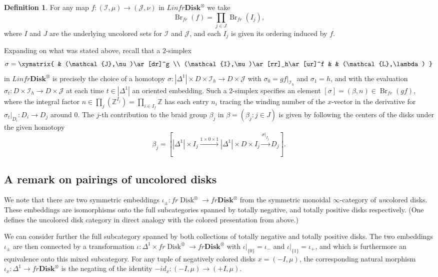 \documentclass[reqno]{amsart}
\theoremstyle{definition}
\newtheorem{definition}[lemma]{Definition}
\newcommand{\mcl}[1]{\mathcal{#1}}
\newcommand{\opn}[1]{\operatorname{#1}}
\newcommand{\ot}{\otimes}
\newcommand{\Disk}{\mathbf{Disk}}
\renewcommand{\1}{\mathbf{1}}
\begin{document}
\begin{definition}
For any map $f:(\mcl{I},\mu)\to (\mcl{J},\nu)$ in $Linfr\Disk^{\ot}$ we take
\[
\opn{Br}_{fr}(f)=\prod_{j\in J}\opn{Br}_{fr}(I_j),
\]
where $I$ and $J$ are the underlying uncolored sets for $\mcl{I}$ and $\mcl{J}$, and each $I_j$ is given its ordering induced by $f$.
\end{definition}

Expanding on what was stated above, recall that a $2$-simplex
\[
\sigma=
\xymatrix{
 & (\mcl{J},\nu)\ar[dr]^g \\
(\mcl{I},\mu)\ar[rr]_h\ar[ur]^f & & (\mcl{L},\lambda)
}
\]
in $Linfr\Disk^{\ot}$ is precisely the choice of a homotopy $\sigma:|\Delta^1|\times D\times \mcl{I}_h\to D\times \mcl{J}$ with $\sigma_0=gf|_{\mcl{I}_h}$ and $\sigma_1=h$, and with the evaluation $\sigma_t:D\times \mcl{I}_h\to D\times \mcl{J}$ at each time $t\in |\Delta^1|$ an oriented embedding.  Such a $2$-simplex specifies an element $[\sigma]=(\beta,n)\in \opn{Br}_{fr}(gf)$, where the integral factor $n\in \prod_j(\mathbb{Z}^{I_j})=\prod_{i\in I_f}\mathbb{Z}$ has each entry $n_i$ tracing the winding number of the $x$-vector in the derivative for $\sigma_t|_{D_i}:D_i\to D_j$ around $0$.  The $j$-th contribution to the braid group $\beta_j$ in $\beta=(\beta_j:j\in J)$ is given by following the centers of the disks under the given homotopy
\[
\beta_j=\left[|\Delta^1|\times I_j\overset{1\times0\times 1}\to |\Delta^1|\times D\times I_j\overset{\sigma|_{I_j}}\to D_j\right].
\]

\subsection{A remark on pairings of uncolored disks}
\label{sect:pairing}

We note that there are two symmetric embeddings $\iota_{\pm}:fr\opn{Disk}^{\ot}\to fr\Disk^{\ot}$ from the symmetric monoidal $\infty$-category of \emph{un}colored disks. These embeddings are isomorphisms onto the full subcategories spanned by totally negative, and totally positive disks respectively. (One defines the uncolored disk category in direct analogy with the colored presentation from above.)

We can consider further the full subcategory spanned by both collections of totally negative and totally positive disks. The two embeddings $\iota_{\pm}$ are then connected by a transformation $\iota:\Delta^1\times fr\opn{Disk}^{\ot}\to fr\Disk^{\ot}$ with $\iota|_{\{0\}}=\iota_-$ and $\iota|_{\{1\}}=\iota_+$, and which is furthermore an equivalence onto this mixed subcategory. For any tuple of negatively colored disks $x=(-I,\mu)$, the corresponding natural morphism $\iota_x:\Delta^1\to fr\Disk^{\ot}$ is the negating of the identity $-id_x:(-I,\mu)\to (+I,\mu)$.
\par
\end{document}
